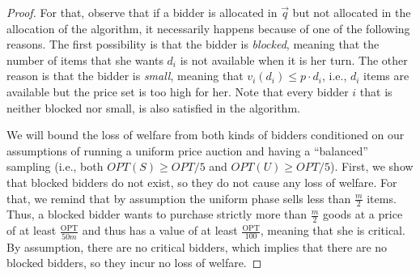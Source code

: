 \begin{proof}
For that, observe that if  a bidder is allocated in $\vec q$ but not allocated in the allocation of the algorithm, it necessarily happens because of one of the following reasons. The first possibility is that the bidder is \emph{blocked}, meaning that   the number of items that she wants $d_i$ is not available when it is her turn. The other reason is that the bidder is \emph{small}, meaning that  $v_i(d_i)\le p\cdot d_i$, i.e., 
$d_i$ items are available  but
the 
price set is too high for her. 
Note that every bidder $i$ that 
is neither blocked nor small, is also satisfied in the algorithm.  

We will bound the loss of welfare from both kinds of bidders conditioned on our assumptions
of running a uniform price auction and having a ``balanced''  sampling  (i.e., both $OPT(S) \geq OPT/5$ and $OPT(U) \geq OPT/5$).
First, we show that blocked bidders do not exist, so they do not cause any loss of welfare. 
For that, we remind that by assumption the uniform phase sells less than $\frac
m 2$ items. Thus, a  blocked bidder wants to 
purchase strictly more than $\frac m 2
$ goods at a price of at least $\frac{\text{OPT}}{50m}$ and thus has a value of at least $\frac{\text{OPT}}{100}$, meaning that she is critical.  By assumption, there are no critical bidders, which implies that there are no blocked bidders, so they incur no loss of welfare.


\end{proof}
